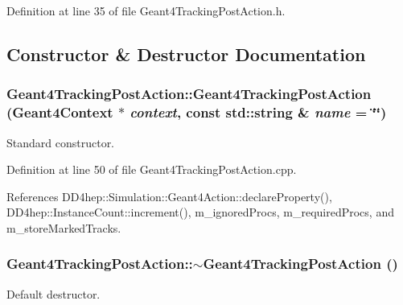 Definition at line 35 of file Geant4TrackingPostAction.h.

\subsection{Constructor \& Destructor Documentation}
\hypertarget{class_d_d4hep_1_1_simulation_1_1_geant4_tracking_post_action_ae3d8aa2136d0c2604a1704ae8e4193c7}{
\subsubsection[{Geant4TrackingPostAction}]{\setlength{\rightskip}{0pt plus 5cm}Geant4TrackingPostAction::Geant4TrackingPostAction ({\bf Geant4Context} $\ast$ {\em context}, \/  const std::string \& {\em name} = {\ttfamily \char`\"{}\char`\"{}})}}
\label{class_d_d4hep_1_1_simulation_1_1_geant4_tracking_post_action_ae3d8aa2136d0c2604a1704ae8e4193c7}


Standard constructor. 

Definition at line 50 of file Geant4TrackingPostAction.cpp.

References DD4hep::Simulation::Geant4Action::declareProperty(), DD4hep::InstanceCount::increment(), m\_\-ignoredProcs, m\_\-requiredProcs, and m\_\-storeMarkedTracks.\hypertarget{class_d_d4hep_1_1_simulation_1_1_geant4_tracking_post_action_a25395b6df98baa403430c74dfe37b453}{
\subsubsection[{$\sim$Geant4TrackingPostAction}]{\setlength{\rightskip}{0pt plus 5cm}Geant4TrackingPostAction::$\sim$Geant4TrackingPostAction ()}}
\label{class_d_d4hep_1_1_simulation_1_1_geant4_tracking_post_action_a25395b6df98baa403430c74dfe37b453}


Default destructor. 

